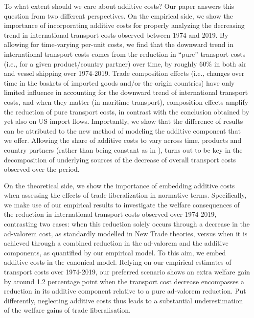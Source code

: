 \documentclass[a4paper,11pt]{article}
\begin{document}
To what extent should we care about additive costs? Our paper answers this question from two different perspectives.
On the empirical side, we show the importance of incorporating additive costs for properly analyzing the decreasing trend in international transport costs observed between 1974 and 2019. By allowing for time-varying per-unit costs, we find that the downward trend in international transport costs comes from the reduction in ``pure'' transport costs (i.e., for a given product/country partner) over time, by roughly 60\% in both air and vessel shipping over 1974-2019. Trade composition effects (i.e., changes over time in the baskets of imported goods and/or the origin countries) have only limited influence in accounting for the downward trend of international transport costs, and when they matter (in maritime transport), composition effects amplify the reduction of pure transport costs, in contrast with the conclusion obtained by \cite{hummels2007} yet also on US import flows.
Importantly, we show that the difference of results can be attributed to the new method of modeling the additive component that we offer. Allowing the share of additive costs to vary across time, products and country partners (rather than being constant as in \citealp{hummels2007}), turns out to be key in the decomposition of underlying sources of the decrease of overall transport costs observed over the period.\smallskip

On the theoretical side, we show the importance of embedding additive costs when assessing the effects of trade liberalization in normative terms. Specifically, we make use of our empirical results to investigate the welfare consequences of the reduction in international transport costs observed over 1974-2019, contrasting two cases: when this reduction solely occurs through a decrease in the ad-valorem cost, as standardly modelled in New Trade theories, versus when it is achieved through a combined reduction in the ad-valorem and the additive components, as quantified by our empirical model. To this aim, we embed additive costs in the canonical \cite{melitz} model. Relying on our empirical estimates of transport costs
over 1974-2019, our preferred scenario shows an extra welfare gain by around 1.2 percentage point when the transport cost decrease encompasses a reduction in its additive component relative to a pure ad-valorem reduction. Put differently, neglecting additive costs thus leads to a substantial underestimation of the welfare gains of trade liberalisation.
\end{document}
